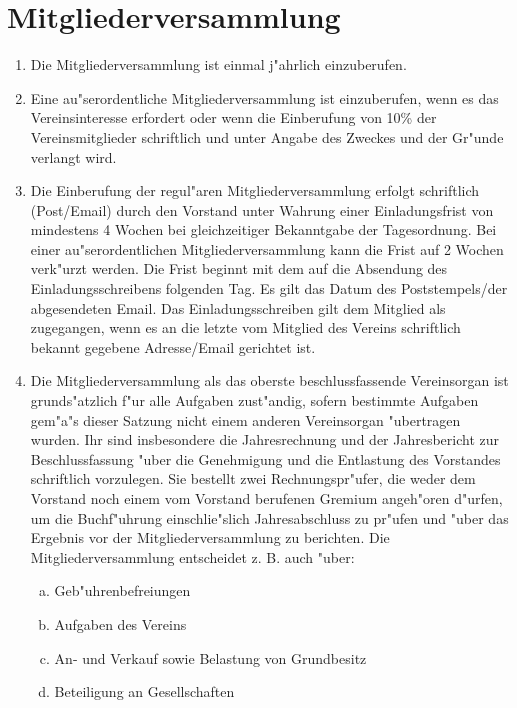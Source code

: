 \documentclass[a5paper, ngerman, 10pt]{scrreprt}
\begin{document}
\section{Mitgliederversammlung}
\begin{enumerate}[(1)]
    \item Die Mitgliederversammlung ist einmal j"ahrlich einzuberufen.
    \item Eine au"serordentliche Mitgliederversammlung ist einzuberufen, wenn es
        das Vereinsinteresse erfordert oder wenn die Einberufung von 10\% der
        Vereinsmitglieder schriftlich und unter Angabe des Zweckes und der
        Gr"unde verlangt wird.
    \item Die Einberufung der regul"aren Mitgliederversammlung erfolgt
        schriftlich (Post/Email) durch den Vorstand unter Wahrung einer
        Einladungsfrist von mindestens 4 Wochen bei gleichzeitiger Bekanntgabe
        der Tagesordnung. Bei einer au"serordentlichen Mitgliederversammlung
        kann die Frist auf 2 Wochen verk"urzt werden. Die Frist beginnt mit dem
        auf die Absendung des Einladungsschreibens folgenden Tag. Es gilt das
        Datum des Poststempels/der abgesendeten Email. Das Einladungsschreiben
        gilt dem Mitglied als zugegangen, wenn es an die letzte vom Mitglied des
        Vereins schriftlich bekannt gegebene Adresse/Email gerichtet ist.
    \item Die Mitgliederversammlung als das oberste beschlussfassende
        Vereinsorgan ist grunds"atzlich f"ur alle Aufgaben zust"andig, sofern
        bestimmte Aufgaben gem"a"s dieser Satzung nicht einem anderen
        Vereinsorgan "ubertragen wurden. Ihr sind insbesondere die
        Jahresrechnung und der Jahresbericht zur Beschlussfassung "uber die
        Genehmigung und die Entlastung des Vorstandes schriftlich vorzulegen.
        Sie bestellt zwei Rechnungspr"ufer, die weder dem Vorstand noch einem
        vom Vorstand berufenen Gremium angeh"oren d"urfen, um die Buchf"uhrung
        einschlie"slich Jahresabschluss zu pr"ufen und "uber das Ergebnis vor
        der Mitgliederversammlung zu berichten. Die Mitgliederversammlung
        entscheidet z. B. auch "uber:
    \begin{enumerate}[a.]
        \item Geb"uhrenbefreiungen
        \item Aufgaben des Vereins
        \item An- und Verkauf sowie Belastung von Grundbesitz
        \item Beteiligung an Gesellschaften

\end{enumerate}
\end{enumerate}
\end{document}
